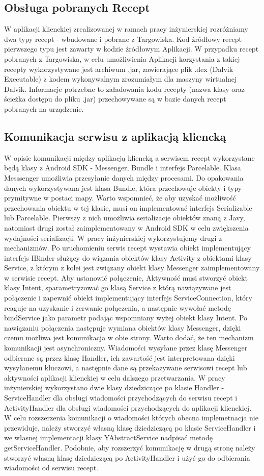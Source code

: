 \documentclass[11pt,a4paper,polish,thesis]{dcsbook}
\begin{document}
\subsection {Obsługa pobranych  Recept}
W aplikacji klienckiej zrealizowanej w ramach pracy inżynierskiej rozróżniamy dwa typy recept - wbudowane i pobrane z Targowiska. Kod źródłowy recept pierwszego typu jest zawarty w kodzie źródłowym Aplikacji. W przypadku recept pobranych z Targowiska, w celu umożliwienia Aplikacji korzystania z takiej recepty wykorzystywane jest archiwum .jar, zawierające plik .dex (Dalvik Executable) z kodem wykonywalnym  zrozumiałym dla maszyny wirtualnej Dalvik. Informacje potrzebne to załadowania kodu recepty (nazwa klasy oraz ścieżka dostępu do pliku .jar) przechowywane są w bazie danych recept pobranych na urządzenie. 
\subsection{Komunikacja serwisu z aplikacją kliencką}
W opisie komunikacji między aplikacją kliencką a serwisem recept wykorzystane będą klasy z Android SDK - Messenger, Bundle i interfejs Parcelable. Klasa Messsenger umożliwia przesyłanie danych między procesami. Do opakowania danych wykorzystywana jest klasa Bundle, która przechowuje obiekty i typy prymitywne w postaci mapy. Warto wspomnieć, że aby uzyskać możliwość przechowania obiektu w tej klasie, musi on implementować interfejs Serializable lub Parcelable. Pierwszy z nich umożliwia serializacje obiektów znaną z Javy, natomiast drugi został zaimplementowany w Android SDK w celu zwiększenia wydajności serializacji. W pracy inżynierskiej wykorzystujemy drugi z mechanizmów. Po uruchomieniu serwis recept wystawia obiekt implementujący interfejs IBinder służący do wiązania obiektów klasy Activity z obiektami klasy Service,  z którym z kolei jest związany obiekt klasy Messenger zaimplementowany w serwisie recept. Aby ustanowić połączenie, Aktywność musi stworzyć obiekt klasy Intent, sparametryzować go klasą Service z którą nawiązywane jest połączenie i zapewnić obiekt implementujący interfejs ServiceConnection, który reaguje na uzyskanie i zerwanie połączenia, a następnie wywołać metodę bindService jako parametr podając wspomniany wyżej obiekt klasy Intent. Po nawiązaniu połączenia następuje wymiana obiektów klasy Messenger, dzięki czemu możliwa jest komunikacja w obie strony. Warto dodać, że ten mechanizm komunikacji jest asynchroniczny. Wiadomości wysyłane przez klasę Messenger odbierane są przez klasę Handler, ich zawartość jest interpretowana dzięki wysyłanemu kluczowi, a następnie dane są przekazywane serwisowi recept lub aktywności aplikacji klienckiej w celu dalszego przetwarzania. W pracy inżynierskiej wykorzystano dwie klasy dziedziczące po klasie Handler - ServiceHandler dla obsługi wiadomości przychodzących do serwisu recept i ActivityHandler dla obsługi wiadomości przychodzących do aplikacji klienckiej. W celu rozszerzenia komunikacji o wiadomości których obecna implemetnacja nie przewiduje, należy stworzyć własną klasę dziedziczącą po klasie ServiceHandler i we własnej implementacji klasy YAbstractService nadpisać metodę getServiceHandler. Podobnie, aby rozszerzyć komunikację w drugą stronę należy stworzyć własną klasę dziedziczącą po ActivityHandler i użyć go do odbierania wiadomości od serwisu recept.
\end{document}
